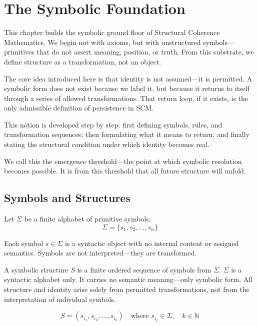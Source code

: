 \chapter{The Symbolic Foundation}

This chapter builds the symbolic ground floor of Structural Coherence Mathematics. We begin not with axioms, but with unstructured symbols---primitives that do not assert meaning, position, or truth. From this substrate, we define structure as a transformation, not an object.

The core idea introduced here is that identity is not assumed---it is permitted. A symbolic form does not exist because we label it, but because it returns to itself through a series of allowed transformations. That return loop, if it exists, is the only admissible definition of persistence in SCM.

This notion is developed step by step: first defining symbols, rules, and transformation sequences; then formulating what it means to return; and finally stating the structural condition under which identity becomes real.

We call this the emergence threshold---the point at which symbolic resolution becomes possible. It is from this threshold that all future structure will unfold.

\section{Symbols and Structures}

Let $\Sigma$ be a finite alphabet of primitive symbols:
\begin{equation} \label{eq:sigma}
\Sigma = \{ s_1, s_2, \dots, s_n \}
\end{equation}

Each symbol $s \in \Sigma$ is a syntactic object with no internal content or assigned semantics.  
Symbols are not interpreted—they are transformed.

A symbolic structure $S$ is a finite ordered sequence of symbols from $\Sigma$.  
$\Sigma$ is a syntactic alphabet only. It carries no semantic meaning—only symbolic form.  
All structure and identity arise solely from permitted transformations, not from the interpretation of individual symbols.

\begin{equation} \label{eq:symbolic-structure}
S = (s_{i_1}, s_{i_2}, \dots, s_{i_k}) \quad \text{where } s_{i_j} \in \Sigma,\quad k \in \mathbb{N}
\end{equation}

